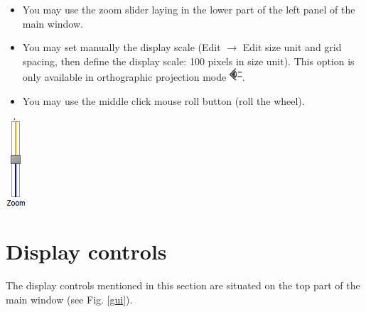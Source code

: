 \begin{minipage}{0.7\textwidth}
\begin{itemize}
\item You may use the zoom slider laying in the lower part of the left panel of the main window.
\item	You may set manually the display scale (Edit $\rightarrow$  Edit size unit and grid spacing, then define the display scale: 100 pixels in size unit). This option is only available in orthographic projection mode \includegraphics[scale=0.7]{images/06/camera/camera_ortho.png}.
\item	You may use the middle click mouse roll button (roll the wheel).
\end{itemize}
\end{minipage}    
\begin{minipage}{0.25\textwidth}\centering
  \includegraphics[scale=0.5]{images/06/camera/zoom_slider.png}


 \end{minipage}    


\section{Display controls}
The display controls mentioned in this section are situated on the top part of the main window (see Fig. \ref{gui}).


